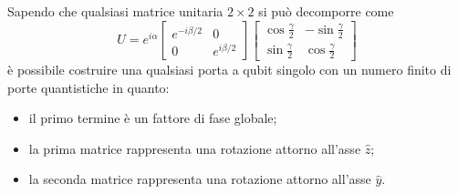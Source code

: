 Sapendo che qualsiasi matrice unitaria $2\times2$ si può decomporre come
\begin{equation}
    U=e^{i\alpha}
    \begin{bmatrix}
        e^{-i\beta/2} & 0\\
        0 & e^{i\beta/2}
    \end{bmatrix}
    \begin{bmatrix}
        \cos{\frac{\gamma}{2}} & -\sin{\frac{\gamma}{2}}\\
        \sin{\frac{\gamma}{2}} & \cos{\frac{\gamma}{2}}
    \end{bmatrix}
\end{equation}
è possibile costruire una qualsiasi porta a qubit singolo con un numero finito di porte quantistiche in quanto:
\begin{itemize}
    \renewcommand\labelitemi{--}
    \item il primo termine è un fattore di fase globale;
    \item la prima matrice rappresenta una rotazione attorno all'asse $\hat{z}$;
    \item la seconda matrice rappresenta una rotazione attorno all'asse $\hat{y}$.
\end{itemize}

